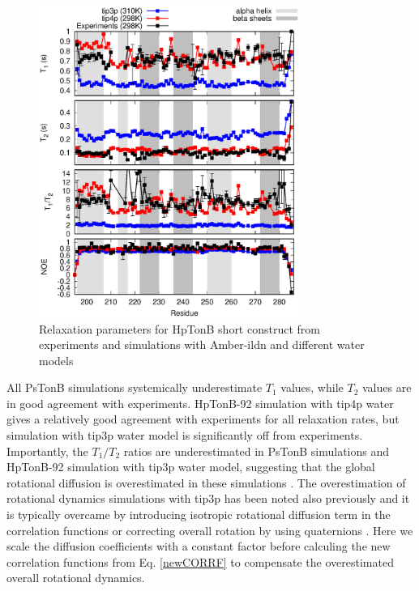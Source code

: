 \documentclass[pre,aps,floatfix,authordate1-4,twocolumn]{revtex4-1}
\begin{document}
\begin{figure}[!h]
  \includegraphics[width=8.5cm]{../Figs/HpTonBrelaxationDATA.eps}%
  \caption{Relaxation parameters for HpTonB short construct from
    experiments and simulations with Amber-ildn and different water models
    \label{HpTonBrelaxationDATA}}%
\end{figure}

All PsTonB simulations systemically underestimate $T_1$ values, while
$T_2$ values are in good agreement with experiments. 
HpTonB-92 simulation with tip4p water gives a relatively good agreement with
experiments for all relaxation rates, but simulation with tip3p water model is
significantly off from experiments. Importantly, the $T_1/T_2$ ratios are
underestimated in PsTonB simulations and HpTonB-92 simulation with tip3p water
model, suggesting that the global rotational diffusion is overestimated in
these simulations \cite{carper97}. The overestimation of rotational dynamics
simulations with tip3p has been noted also previously \cite{wong08} and it is typically
overcame by introducing isotropic rotational diffusion term in the correlation
functions \cite{??} or correcting overall rotation by using quaternions \cite{andersson12}.
Here we scale the diffusion coefficients with a constant factor before
calculing the new correlation functions from Eq. \ref{newCORRF} to compensate
the overestimated overall rotational dynamics.
\end{document}
